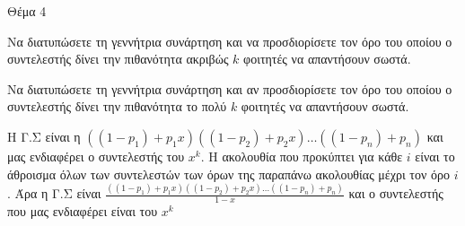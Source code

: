 \documentclass{assignment}
\begin{document}
\begin{problem}{Θέμα 4}

%
 Να διατυπώσετε τη γεννήτρια συνάρτηση και να προσδιορίσετε τον όρο του οποίου ο συντελεστής δίνει την πιθανότητα 
ακριβώς $k$ φοιτητές να απαντήσουν σωστά.

 Να διατυπώσετε τη γεννήτρια συνάρτηση και αν προσδιορίσετε τον όρο του οποίου ο συντελεστής δίνει την πιθανότητα
το πολύ $k$ φοιτητές να απαντήσουν σωστά.

\solution

\answer Η Γ.Σ είναι η $((1-p_1) + p_1x)((1-p_2) + p_2x)\dots((1-p_n) + p_n)$ και μας ενδιαφέρει ο συντελεστής του $x^k$.
\answer Η ακολουθία που προκύπτει για κάθε $i$ είναι το άθροισμα όλων των συντελεστών των όρων της παραπάνω ακολουθίας μέχρι
τον όρο $i$. Άρα η Γ.Σ είναι $\frac{((1-p_1) + p_1x)((1-p_2) + p_2x)\dots((1-p_n) + p_n)}{1-x}$ και ο συντελεστής που μας 
ενδιαφέρει είναι του $x^k$
\end{problem}
\end{document}
